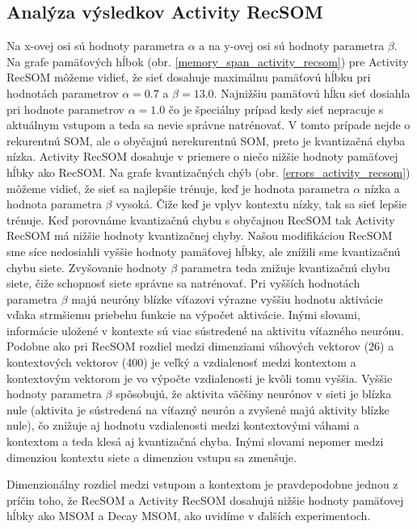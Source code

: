 \subsection{Analýza výsledkov Activity RecSOM}
Na x-ovej osi sú hodnoty parametra $\alpha$ a na y-ovej osi sú hodnoty parametra $\beta$.
Na grafe pamäťových hĺbok (obr. \ref{memory_span_activity_recsom}) pre Activity RecSOM môžeme vidieť, že sieť dosahuje 
maximálnu pamäťovú hĺbku pri hodnotách parametrov $\alpha = 0.7$ a $\beta = 13.0$.
Najnižšiu pamäťovú hĺku sieť dosiahla pri hodnote parametrov  $\alpha = 1.0$ čo je špeciálny prípad
kedy sieť nepracuje s aktuálnym vstupom a teda sa nevie správne natrénovať. V tomto prípade nejde o rekurentnú SOM, ale o obyčajnú
nerekurentnú SOM, preto je kvantizačná chyba nízka. 
Activity RecSOM dosahuje v priemere o niečo nižšie hodnoty pamäťovej hĺbky ako RecSOM.
Na grafe kvantizačných chýb (obr. \ref{errors_activity_recsom}) môžeme vidieť, že sieť sa najlepšie trénuje, keď je hodnota 
parametra $\alpha$ nízka a hodnota parametra $\beta$ vysoká. Čiže keď je vplyv kontextu nízky, tak sa sieť lepšie trénuje.
Keď porovnáme kvantizačnú chybu s obyčajnou RecSOM tak Activity RecSOM má nižšie hodnoty kvantizačnej chyby. 
Našou modifikáciou RecSOM sme síce nedosiahli vyššie hodnoty pamäťovej hĺbky, ale znížili sme kvantizačnú chybu siete.
Zvyšovanie hodnoty $\beta$ parametra teda znižuje kvantizačnú chybu siete, čiže schopnosť siete správne sa natrénovať.
Pri vyšších hodnotách parametra $\beta$ majú neuróny blízke víťazovi výrazne vyššiu hodnotu aktivácie vďaka strmšiemu priebehu funkcie na výpočet aktivácie. 
Inými slovami, informácie uložené v kontexte sú viac sústredené na aktivitu víťazného neurónu. 
Podobne ako pri RecSOM rozdiel medzi dimenziami váhových vektorov (26) a kontextových vektorov (400) je veľký a vzdialenosť medzi kontextom a kontextovým vektorom
je vo výpočte vzdialenosti je kvôli tomu vyššia. Vyššie hodnoty parametra $\beta$ spôsobujú, že aktivita väčšiny neurónov v sieti je blízka nule (aktivita je sústredená na víťazný neurón a zvyšené majú aktivity blízke nule), čo znižuje aj hodnotu
vzdialenosti medzi kontextovými váhami a kontextom a teda klesá aj kvantizačná chyba. Inými slovami nepomer medzi dimenziou kontextu siete a dimenziou vstupu sa zmenšuje.

Dimenzionálny rozdiel medzi vstupom a kontextom je pravdepodobne jednou z príčin toho, že RecSOM a Activity RecSOM dosahujú nižšie hodnoty 
pamäťovej hĺbky ako MSOM a Decay MSOM, ako uvidíme v ďalších experimentoch.


